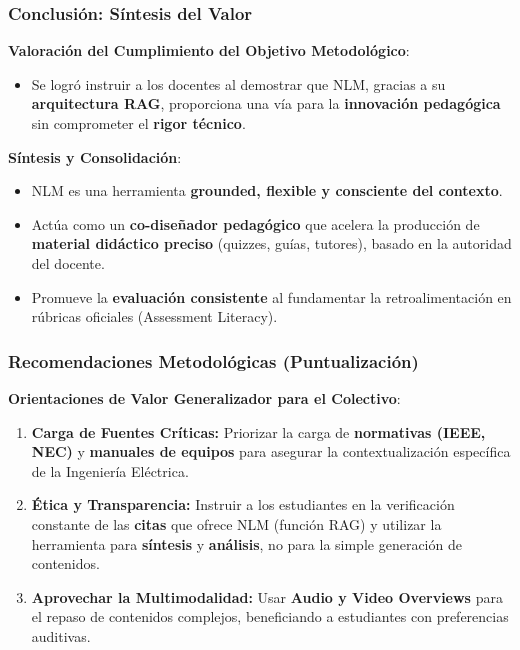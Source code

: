 \documentclass[aspectratio=43]{beamer}
\begin{document}

\begin{frame}
\frametitle{ Conclusión: Síntesis del Valor}

\textbf{Valoración del Cumplimiento del Objetivo Metodológico}:
\begin{itemize}
    \item Se logró instruir a los docentes al demostrar que NLM, gracias a su \textbf{arquitectura RAG}, proporciona una vía para la \textbf{innovación pedagógica} sin comprometer el \textbf{rigor técnico}.
\end{itemize}

\vfill
\textbf{Síntesis y Consolidación}:
\begin{itemize}
    \item NLM es una herramienta \textbf{grounded, flexible y consciente del contexto}.
    \item Actúa como un \textbf{co-diseñador pedagógico} que acelera la producción de \textbf{material didáctico preciso} (quizzes, guías, tutores), basado en la autoridad del docente.
    \item Promueve la \textbf{evaluación consistente} al fundamentar la retroalimentación en rúbricas oficiales (Assessment Literacy).
\end{itemize}
\end{frame}

\begin{frame}
\frametitle{ Recomendaciones Metodológicas (Puntualización)}

\textbf{Orientaciones de Valor Generalizador para el Colectivo}:
\begin{enumerate}
    \item \textbf{Carga de Fuentes Críticas:} Priorizar la carga de \textbf{normativas (IEEE, NEC)} y \textbf{manuales de equipos} para asegurar la contextualización específica de la Ingeniería Eléctrica.
    \item \textbf{Ética y Transparencia:} Instruir a los estudiantes en la verificación constante de las \textbf{citas} que ofrece NLM (función RAG) y utilizar la herramienta para \textbf{síntesis} y \textbf{análisis}, no para la simple generación de contenidos.
    \item \textbf{Aprovechar la Multimodalidad:} Usar \textbf{Audio y Video Overviews} para el repaso de contenidos complejos, beneficiando a estudiantes con preferencias auditivas.
\end{enumerate}
\end{frame}
\end{document}
